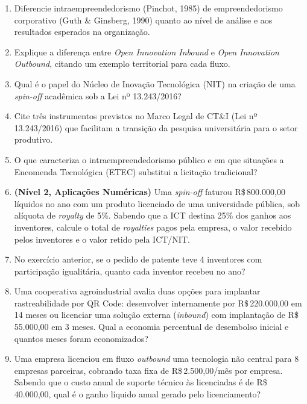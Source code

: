\begin{enumerate}[leftmargin=1.5em, itemsep=6pt]
  \item Diferencie intraempreendedorismo (Pinchot, 1985) de empreendedorismo corporativo (Guth \& Ginsberg, 1990) quanto ao nível de análise e aos resultados esperados na organização.
  \espacoResolucao[1.8cm]

  \item Explique a diferença entre \textit{Open Innovation Inbound} e \textit{Open Innovation Outbound}, citando um exemplo territorial para cada fluxo.
  \espacoResolucao[1.8cm]

  \item Qual é o papel do Núcleo de Inovação Tecnológica (NIT) na criação de uma \textit{spin-off} acadêmica sob a Lei nº 13.243/2016?
  \espacoResolucao[1.8cm]

  \item Cite três instrumentos previstos no Marco Legal de CT\&I (Lei nº 13.243/2016) que facilitam a transição da pesquisa universitária para o setor produtivo.
  \espacoResolucao[1.8cm]

  \item O que caracteriza o intraempreendedorismo público e em que situações a Encomenda Tecnológica (ETEC) substitui a licitação tradicional?
  \espacoResolucao[1.8cm]

  \item \textbf{(Nível 2, Aplicações Numéricas)} Uma \textit{spin-off} faturou R\$\,800.000,00 líquidos no ano com um produto licenciado de uma universidade pública, sob alíquota de \textit{royalty} de 5\%. Sabendo que a ICT destina 25\% dos ganhos aos inventores, calcule o total de \textit{royalties} pagos pela empresa, o valor recebido pelos inventores e o valor retido pela ICT/NIT.
  \espacoResolucao[2.3cm]

  \item No exercício anterior, se o pedido de patente teve 4 inventores com participação igualitária, quanto cada inventor recebeu no ano?
  \espacoResolucao[2.0cm]

  \item Uma cooperativa agroindustrial avalia duas opções para implantar rastreabilidade por QR Code: desenvolver internamente por R\$\,220.000,00 em 14 meses ou licenciar uma solução externa (\textit{inbound}) com implantação de R\$\,55.000,00 em 3 meses. Qual a economia percentual de desembolso inicial e quantos meses foram economizados?
  \espacoResolucao[2.2cm]

  \item Uma empresa licenciou em fluxo \textit{outbound} uma tecnologia não central para 8 empresas parceiras, cobrando taxa fixa de R\$\,2.500,00/mês por empresa. Sabendo que o custo anual de suporte técnico às licenciadas é de R\$\,40.000,00, qual é o ganho líquido anual gerado pelo licenciamento?
  \espacoResolucao[2.2cm]


\end{enumerate}
